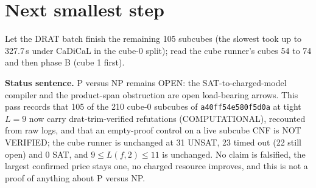 \documentclass[11pt]{article}
\begin{document}
\section*{Next smallest step}
Let the DRAT batch finish the remaining 105 subcubes (the slowest took up to 327.7\,s under CaDiCaL in the cube-0 split); read the cube runner's cubes 54 to 74 and then phase B (cube 1 first).

\bigskip
\noindent\textbf{Status sentence.} P versus NP remains OPEN: the SAT-to-charged-model compiler and the product-span obstruction are open load-bearing arrows. This pass records that 105 of the 210 cube-0 subcubes of \texttt{a40ff54e580f5d0a} at tight $L=9$ now carry drat-trim-verified refutations (COMPUTATIONAL), recounted from raw logs, and that an empty-proof control on a live subcube CNF is NOT VERIFIED; the cube runner is unchanged at 31 UNSAT, 23 timed out (22 still open) and 0 SAT, and $9\le L(f,2)\le 11$ is unchanged. No claim is falsified, the largest confirmed price stays one, no charged resource improves, and this is not a proof of anything about P versus NP.
\end{document}
